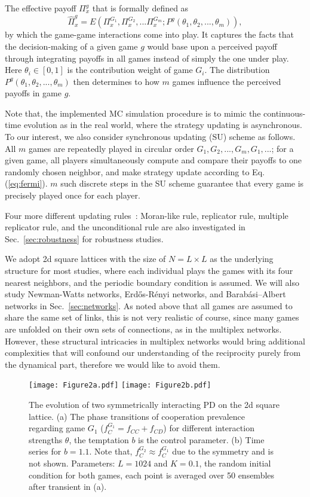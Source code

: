\documentclass[showpacs,superscriptaddress,reprint,nofootinbib,amsmath,amssymb,aps,pre]{revtex4-1}
\begin{document}
The effective payoff $\Pi^g_x$ that is formally defined as
\begin{equation}
\widehat{\Pi}_x^g=E({\Pi}_x^{G_1},{\Pi}_x^{G_2},...{\Pi}_x^{G_m};P^g(\theta_1,\theta_2,...,\theta_m)),
\label{eq:effective_m}
\end{equation}
by which the game-game interactions come into play. It captures the facts that the decision-making of a given game $g$ would base upon a perceived payoff through integrating payoffs in all games instead of simply the one under play. Here $\theta_i\in[0,1]$ is the contribution weight of game $G_i$.
The distribution $P^g(\theta_1,\theta_2,...,\theta_m)$ then determines to how $m$ games influence the perceived payoffs in game $g$. 

Note that, the implemented MC simulation procedure is to mimic the continuous-time evolution as in the real world, where the strategy updating is asynchronous. To our interest, we also consider synchronous updating (SU) scheme as follows. All $m$ games are repeatedly played in circular order $G_1,G_2,...,G_m,G_1,...$; for a given game, all players simultaneously compute and compare their payoffs to one randomly chosen neighbor, and make strategy update according to Eq.(\ref{eq:fermi}). $m$ such discrete steps in the SU scheme guarantee that every game is precisely played once for each player. 

Four more different updating rules~\cite{roca2009evolutionary}: Moran-like rule, replicator rule, multiple replicator rule, and the unconditional rule are also investigated in Sec.~\ref{sec:robustness} for robustness studies. 

We adopt 2d square lattices with the size of $N=L\times L$ as the underlying structure for most studies, where each individual plays the games with its four nearest neighbors, and the periodic boundary condition is assumed. We will also study Newman-Watts networks, Erd\H{o}s-R\'enyi networks, and Barab\'asi--Albert networks in Sec.~\ref{sec:networks}. As noted above that all games are assumed to share the same set of links, this is not very realistic of course, since many games are unfolded on their own sets of connections, as in the multiplex networks. However, these structural intricacies in multiplex networks would bring additional complexities that will confound our understanding of the reciprocity purely from the dynamical part, therefore we would like to avoid them.

\begin{figure}
\centering
\texttt{[image: Figure2a.pdf]}
\texttt{[image: Figure2b.pdf]}
\caption{
The evolution of two symmetrically interacting PD on the 2d square lattice.
(a) The phase transitions of cooperation prevalence regarding game $G_1$ ($f^{G_1}_C=f_{CC}+f_{CD}$) for different interaction strengths $\theta$, the temptation $b$ is the control parameter.  
(b) Time series for $b=1.1$. 
Note that, $f^{G_2}_C\approx f^{G_1}_C$ due to the symmetry and is not shown.
Parameters: $L=1024$ and $K=0.1$, the random initial condition for both games, each point is averaged over 50 ensembles after transient in (a).
}
\label{fig:ts}
\end{figure}
\end{document}
